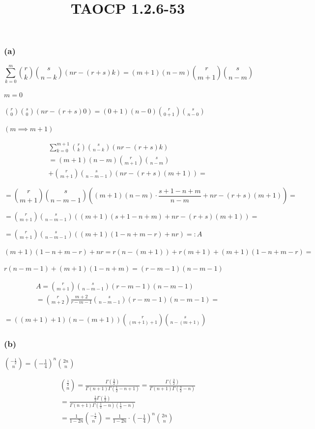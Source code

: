 \documentclass{article}
\title{TAOCP 1.2.6\mbox{-}53}
\begin{document}
\maketitle

\subsubsection*{(a)}

\[ \sum_{k=0}^{m} \binom{r}{k}\binom{s}{n-k}(nr-(r+s)k) = (m+1)(n-m) \binom{r}{m+1}\binom{s}{n-m} \]

\( m = 0 \)

\( \binom{r}{0}\binom{s}{0}(nr-(r+s)0) = (0+1)(n-0) \binom{r}{0+1}\binom{s}{n-0} \)

\( (m \implies m + 1) \)

\begin{multline*}
\sum_{k=0}^{m+1} \binom{r}{k}\binom{s}{n-k}(nr-(r+s)k) \\
= (m+1)(n-m) \binom{r}{m+1}\binom{s}{n-m} \\
+ \binom{r}{m+1}\binom{s}{n-m-1}(nr - (r+s)(m+1)) =
\end{multline*}

\[ = \binom{r}{m+1}\binom{s}{n-m-1} ((m+1)(n-m) \cdot \frac{s+1-n+m}{n-m} + nr - (r+s)(m+1)) = \]

\( = \binom{r}{m+1}\binom{s}{n-m-1} ((m+1)(s+1-n+m) + nr - (r+s)(m+1)) = \)

\( = \binom{r}{m+1}\binom{s}{n-m-1} ((m+1)(1-n+m-r) + nr) =: A \)

\( (m+1)(1-n+m-r) + nr = r(n-(m+1)) + r(m+1) + (m+1)(1-n+m-r) = \)

\( r(n-m-1) + (m+1)(1-n+m) = (r-m-1)(n-m-1) \)

\begin{multline*}
A = \binom{r}{m+1}\binom{s}{n-m-1} (r-m-1)(n-m-1) \\
= \binom{r}{m+2} \frac{m+2}{r-m-1} \binom{s}{n-m-1} (r-m-1)(n-m-1) =
\end{multline*}

\( = ((m+1)+1)(n-(m+1)) \binom{r}{(m+1)+1} \binom{s}{n-(m+1)} \)

\subsubsection*{(b)}

\( \binom{-\frac{1}{2}}{n} = {(-\frac{1}{4})}^{n} \binom{2n}{n} \)

\begin{multline*}
\binom{\frac{1}{2}}{n} = \frac{\Gamma(\frac{3}2)}{\Gamma(n+1)\Gamma(\frac{1}{2}-n+1)} = \frac{\Gamma(\frac{3}{2})}{\Gamma(n+1)\Gamma(\frac{3}{2}-n)} \\
= \frac{\frac{1}{2}\Gamma(\frac{1}{2})}{\Gamma(n+1)\Gamma(\frac{1}{2}-n) (\frac{1}{2}-n)} \\
= \frac{1}{1-2n} \binom{-\frac{1}{2}}{n} = \frac{1}{1-2n} \cdot {(-\frac{1}{4})}^{n} \binom{2n}{n}
\end{multline*}
\end{document}
